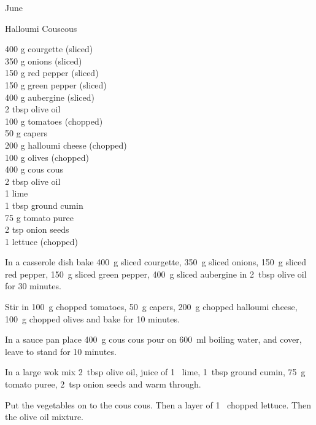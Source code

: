\begin{menu}{June}
    \begin{recipe}{2}{Halloumi Couscous}%
		\begin{ingredients}
		400 g courgette (sliced) \\
	350 g onions (sliced) \\
	150 g red pepper (sliced) \\
	150 g green pepper (sliced) \\
	400 g aubergine (sliced) \\
	2 tbsp olive oil  \\
	100 g tomatoes (chopped) \\
	50 g capers  \\
	200 g halloumi cheese (chopped) \\
	100 g olives (chopped) \\
	400 g cous cous  \\
	2 tbsp olive oil  \\
	1  lime  \\
	1 tbsp ground cumin  \\
	75 g tomato puree  \\
	2 tsp onion seeds  \\
	1  lettuce (chopped) \\
	
		\end{ingredients}
	
    \begin{instructions}
    \item 
        In a casserole dish bake
        400~g sliced courgette,
        350~g sliced onions,
        150~g sliced red pepper,
        150~g sliced green pepper,
        400~g sliced aubergine
        in
        2~tbsp  olive oil
        for 30 minutes.
      \item 
        Stir in
        100~g chopped tomatoes,
        50~g  capers,
        200~g chopped halloumi cheese,
        100~g chopped olives
        and bake for 10 minutes.
      \item 
      In a
      sauce pan 
      place
      400~g  cous cous
      pour on
      600~ml  boiling water,
      and cover, leave to stand for 10 minutes.
    \item 
        In a large wok mix
        2~tbsp  olive oil,
        juice of
        1~  lime,
        1~tbsp  ground cumin,
        75~g  tomato puree,
        2~tsp  onion seeds
        and warm through.
      \item 
        Put the vegetables on to the cous cous.
        Then a layer of
        1~ chopped lettuce.
        Then the olive oil mixture.
      

\end{instructions}
\end{recipe}
\end{menu}
